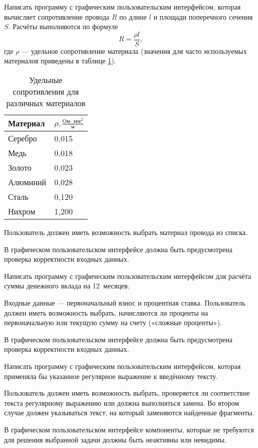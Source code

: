 \task Написать программу с графическим пользовательским интерфейсом,
которая вычисляет сопротивление провода $R$ по длине $l$ и площади
поперечного сечения $S$. Расчёты
выполняются по формуле
\[
R = \frac{\rho l}{S},
\]
где $\rho$ — удельное сопротивление материала (значения для часто
используемых материалов приведены в таблице \ref{table:resistance}).

\begin{table}
  \centering
  \begin{tabular}{l|l}
    Материал&$\rho, \frac{\textrm{Ом}\cdot\textrm{мм}^2}{\textrm{м}}$\\
    \hline
    Серебро  & 0{,}015 \\
    Медь     & 0{,}018 \\
    Золото   & 0{,}023 \\
    Алюминий & 0{,}028 \\
    Сталь    & 0{,}120 \\
    Нихром   & 1{,}200
  \end{tabular}
  \caption{Удельные сопротивления для различных материалов}
  \label{table:resistance}
\end{table}

Пользователь должен иметь возможность выбрать материал провода из списка.

В графическом пользовательском интерфейсе должна быть предусмотрена
проверка корректности входных данных.

\task Написать программу с графическим пользовательским интерфейсом
для расчёта суммы денежного вклада на 12~месяцев.

Входные данные — первоначальный взнос и процентная
ставка. Пользователь должен иметь возможность выбрать, начисляются ли
проценты на первоначальную или текущую сумму на счету («сложные
проценты»).

В графическом пользовательском интерфейсе должна быть предусмотрена
проверка корректности входных данных.

\task Написать программу с графическим пользовательским интерфейсом,
которая применяла бы указанное регулярное выражение к введённому
тексту.

Пользователь должен иметь возможность выбрать, проверяется ли
соответствие текста регулярному выражению или должна выполняться
замена. Во втором случае должен указываться текст, на который
заменяются найденные фрагменты.

В графическом пользовательском интерфейсе компоненты, которые не
требуются для решения выбранной задачи должны быть неактивны или
невидимы.

